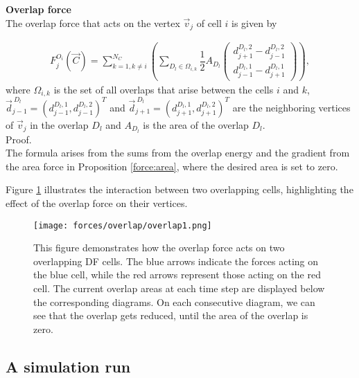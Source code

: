 \begin{proposition} \textbf{Overlap force} \\
	The overlap force that acts on the vertex $\vec{v}_j$ of cell $i$ is given by 

	\begin{align}
		F_j^{O_i}(\vec{C}) = \sum\limits_{k=1, k \neq i}^{N_C} \left( \sum\limits_{D_l \in \Omega_{i,k}} \dfrac{1}{2} A_{D_l} \begin{pmatrix} d_{j+1}^{D_l, 2} - d_{j-1}^{D_l, 2} \\[0.5em]  d_{j-1}^{D_l, 1} - d_{j+1}^{D_l, 1} \end{pmatrix} \right),
	\end{align}
	where $\Omega_{i,k}$ is the set of all overlaps that arise between the cells $i$ and $k$, $\vec{d}_{j-1}^{\: D_l} = (d_{j-1}^{D_l, 1}, d_{j-1}^{D_l, 2})^T$ and $\vec{d}_{j+1}^{\: D_l} = (d_{j+1}^{D_l, 1}, d_{j+1}^{D_l, 2})^T$ are the neighboring vertices of $\vec{v}_j$ in the overlap $D_l$ and $A_{D_l}$ is the area of the overlap $D_l$. \\

	Proof. \\
	The formula arises from the sums from the overlap energy and the gradient from the area force in Proposition \ref{force:area}, where the desired area is set to zero. 
\end{proposition}

Figure \ref{fig:overlapForce} illustrates the interaction between two overlapping cells, highlighting the effect of the overlap force on their vertices.
\begin{figure}[h!]
	\begin{center}
		\texttt{[image: forces/overlap/overlap1.png]}
			\caption{This figure demonstrates how the overlap force acts on two overlapping DF cells.
			The blue arrows indicate the forces acting on the blue cell, while the red arrows represent those acting on the red cell.
			The current overlap areas at each time step are displayed below the corresponding diagrams.			
			On each consecutive diagram, we can see that the overlap gets reduced, until the area of the overlap is zero.  }
			\label{fig:overlapForce}
	\end{center}
\end{figure}


\subsection{A simulation run}

